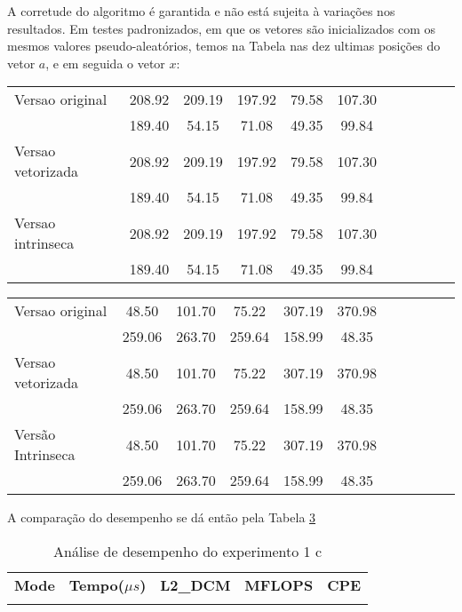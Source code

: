 \documentclass[conference]{IEEEtran}
\begin{document}
A corretude do algoritmo é garantida e não está sujeita à variações nos resultados.
Em testes padronizados, em que os vetores são inicializados com os mesmos valores pseudo-aleatórios, temos na Tabela  nas dez ultimas posições do vetor $a$, e em seguida o vetor $x$: %

\begin{table}[htb!]
\centering
\begin{tabular}{l c c c c c c c c c c }
  Versao original & 208.92 & 209.19 & 197.92 & 79.58 & 107.30\\
   & 189.40 & 54.15 & 71.08 & 49.35 & 99.84 \\
  Versao vetorizada & 208.92 & 209.19 & 197.92 & 79.58 & 107.30\\
   & 189.40 & 54.15 & 71.08 & 49.35 & 99.84 \\
  Versao intrinseca & 208.92 & 209.19 & 197.92 & 79.58 & 107.30\\
   & 189.40 & 54.15 & 71.08 & 49.35 & 99.84
\end{tabular}
\label{tab:exp2.testea}
\end{table}


\begin{table}[htb!]
\centering
\begin{tabular}{ l c c c c c c c c c c }
  Versao original & 48.50 & 101.70 & 75.22 & 307.19 & 370.98\\
   & 259.06 & 263.70 & 259.64 & 158.99 & 48.35 \\
  Versao vetorizada & 48.50 & 101.70 & 75.22 & 307.19 & 370.98\\
   & 259.06 & 263.70 & 259.64 & 158.99 & 48.35 \\
  Versão Intrinseca & 48.50 & 101.70 & 75.22 & 307.19 & 370.98\\
   & 259.06 & 263.70 & 259.64 & 158.99 & 48.35
\end{tabular}
\label{tab:exp2.testeb}
\end{table}

A comparação do desempenho se dá então pela Tabela \ref{tab:exp1.03}

\begin{table}[htb!]
	\centering
	\caption{Análise de desempenho do experimento 1 c}
	\label{tab:exp1.03}
	\begin{tabular}{lrrrr}%
		\bfseries Mode & \bfseries Tempo($\mu{s}$)& \bfseries L2\_DCM & \bfseries MFLOPS & \bfseries CPE
		\csvreader[]{tables/ex_c.csv}{}
		{\\\csvcoli & \csvcolii & \csvcoliii & \csvcoliv & \csvcolv}
	\end{tabular}
\end{table}
\end{document}
